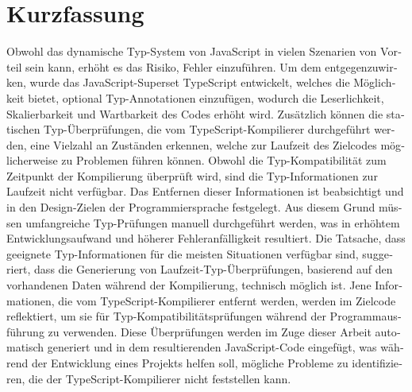 \chapter{Kurzfassung}

\begin{german}
Obwohl das dynamische Typ-System von JavaScript in vielen Szenarien von Vorteil sein kann, erhöht es das Risiko, Fehler einzuführen. Um dem entgegenzuwirken, wurde das JavaScript-Superset TypeScript entwickelt, welches die Möglichkeit bietet, optional Typ-Annotationen einzufügen, wodurch die Leserlichkeit, Skalierbarkeit und Wartbarkeit des Codes erhöht wird. Zusätzlich können die statischen Typ-Überprüfungen, die vom TypeScript-Kompilierer durchgeführt werden, eine Vielzahl an Zuständen erkennen, welche zur Laufzeit des Zielcodes möglicherweise zu Problemen führen können. Obwohl die Typ-Kompatibilität zum Zeitpunkt der Kompilierung überprüft wird, sind die Typ-Informationen zur Laufzeit nicht verfügbar. Das Entfernen dieser Informationen ist beabsichtigt und in den Design-Zielen der Programmiersprache festgelegt. Aus diesem Grund müssen umfangreiche Typ-Prüfungen manuell durchgeführt werden, was in erhöhtem Entwicklungsaufwand und höherer Fehleranfälligkeit resultiert. Die Tatsache, dass geeignete Typ-Informationen für die meisten Situationen verfügbar sind, suggeriert, dass die Generierung von Laufzeit-Typ-Überprüfungen, basierend auf den vorhandenen Daten während der Kompilierung, technisch möglich ist. Jene Informationen, die vom TypeScript-Kompilierer entfernt werden, werden im Zielcode reflektiert, um sie für Typ-Kompatibilitätsprüfungen während der Programmausführung zu verwenden. Diese Überprüfungen werden im Zuge dieser Arbeit automatisch generiert und in dem resultierenden JavaScript-Code eingefügt, was während der Entwicklung eines Projekts helfen soll, mögliche Probleme zu identifizieren, die der TypeScript-Kompilierer nicht feststellen kann.
\end{german}
